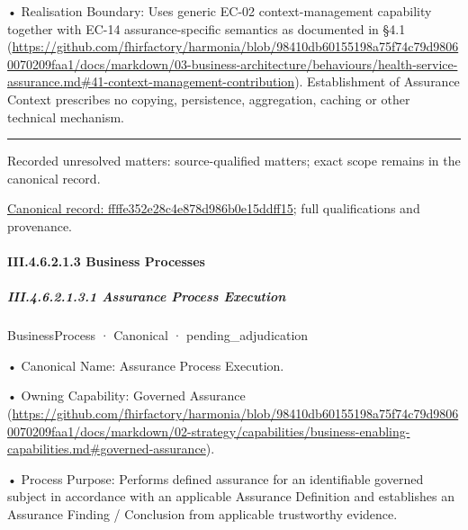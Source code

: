 •
Realisation Boundary: Uses generic EC-02 context-management capability together with EC-14 assurance-specific semantics as documented in §4.1 (\url{https://github.com/fhirfactory/harmonia/blob/98410db60155198a75f74c79d98060070209faa1/docs/markdown/03-business-architecture/behaviours/health-service-assurance.md#41-context-management-contribution}). Establishment of Assurance Context prescribes no copying, persistence, aggregation, caching or other technical mechanism.



\medskip\hrule\medskip

{\small Recorded unresolved matters: source-qualified matters; exact scope remains in the canonical record.}\par
{\footnotesize \href{../../../../../../../continuum/business/business-function/ffffe352e28c4e878d986b0e15ddff15.md}{Canonical record: ffffe352e28c4e878d986b0e15ddff15}; full qualifications and provenance.}\par
\paragraph*{III.4.6.2.1.3 Business Processes}
\label{navigation:III.4.6.2.1.3}

\subparagraph*{III.4.6.2.1.3.1 Assurance Process Execution}
\label{navigation:III.4.6.2.1.3.1}

\label{element:3c67e57403b041bb8ccdaf3980b6ff94}
{\small BusinessProcess · Canonical · pending\_adjudication}\par

•
Canonical Name: Assurance Process Execution.



•
Owning Capability: Governed Assurance (\url{https://github.com/fhirfactory/harmonia/blob/98410db60155198a75f74c79d98060070209faa1/docs/markdown/02-strategy/capabilities/business-enabling-capabilities.md#governed-assurance}).



•
Process Purpose: Performs defined assurance for an identifiable governed subject in accordance with an applicable Assurance Definition and establishes an Assurance Finding / Conclusion from applicable trustworthy evidence.



